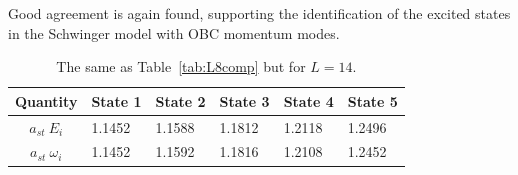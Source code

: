 \documentclass[aps, prc, tightenlines,superscriptaddress, letterpaper, amsmath, amssymb, preprintnumbers, floatfix, longbibliography, nofootinbib]{revtex4-2}
\begin{document}
Good agreement is again found, supporting the identification of the excited states in the Schwinger model with OBC momentum modes.
%
\begin{table}[!t]
\renewcommand{\arraystretch}{1.4}
\begin{tabularx}{\textwidth}{|c || Y | Y | Y | Y | Y | }
 \hline
Quantity & State 1 & State 2 & State 3 & State 4 & State 5 \\
 \hline\hline
$a_{st} \ E_i$ &1.1452 &1.1588&1.1812&1.2118&1.2496\\
\hline
$a_{st} \ \omega_i$ &1.1452&1.1592&1.1816&1.2108&1.2452\\
 \hline
\end{tabularx}
\caption{The same as Table~\ref{tab:L8comp} but for $L=14$.}
 \label{tab:L14comp}
\end{table}
%




\end{document}
